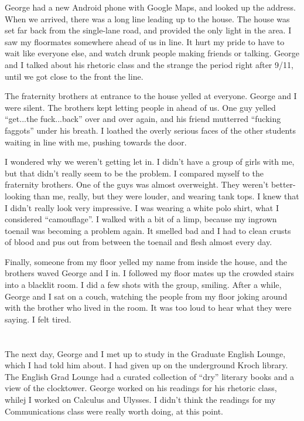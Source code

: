 George had a new Android phone with Google Maps, and looked up the address.
When we arrived, there was a long line leading up to the house.  The house was
set far back from the single-lane road, and provided the only light in the area.
I saw my floormates somewhere ahead of us in line.   It hurt my pride to have to
wait like everyone else, and watch drunk people making friends or talking.
George and I talked about his rhetoric class and the strange the period right
after 9/11, until we got close to the front the line.
 
The fraternity brothers at entrance to the house yelled at everyone.  George and
I were silent.  The brothers kept letting people in ahead of us.  One guy yelled
``get...the fuck...back'' over and over again, and his friend mutterred
``fucking faggots'' under his breath.  I loathed the overly serious faces of the
other students waiting in line with me, pushing towards the door.

I wondered why we weren't getting let in.  I didn't have a group of girls with
me, but that didn't really seem to be the problem.  I compared myself to the
fraternity brothers.  One of the guys was almost overweight.  They weren't
better-looking than me, really, but they were louder, and wearing tank tops.  I
knew that I didn't really look very impressive.  I was wearing a white polo
shirt, what I considered ``camouflage''.  I walked with a bit of a limp, because
my ingrown toenail was becoming a problem again.  It smelled bad and I had to
clean crusts of blood and pus out from between the toenail and flesh almost
every day.

Finally, someone from my floor yelled my name from inside the house, and the
brothers waved George and I in.  I followed my floor mates up the crowded stairs
into a blacklit room.  I did a few shots with the group, smiling.  After a
while, George and I sat on a couch, watching the people from my floor joking
around with the brother who lived in the room.  It was too loud to hear what
they were saying.  I felt tired.

\section{}

The next day, George and I met up to study in the Graduate English Lounge, which
I had told him about.  I had given up on the underground Kroch library.  The
English Grad Lounge  had a curated collection of ``dry'' literary books and a
view of the clocktower.  George worked on his readings for his rhetoric class,
whilej I worked on Calculus and Ulysses.  I didn't think the readings for my
Communications class were really worth doing, at this point.

